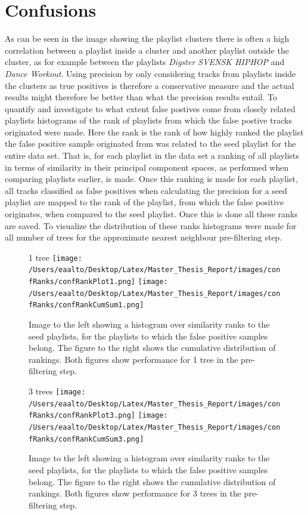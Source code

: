 \documentclass[a4paper,11pt]{kth-mag}
\begin{document}
\section{Confusions}
As can be seen in the image showing the playlist clusters there is often a high correlation between a playlist inside a cluster and another playlist outside the cluster, as for example between the playlists \textit{Digster SVENSK HIPHOP} and \textit{Dance Workout}. Using precision by only considering tracks from playlists inside the clusters as true positives is therefore a conservative measure and the actual results might therefore be better than what the precision results entail. To quantify and investigate to what extent false postives come from closely related playlists histograms of the rank of playlists from which the false postive tracks originated were made. Here the rank is the rank of how highly ranked the playlist the false positive sample originated from was related to the seed playlist for the entire data set. That is, for each playlist in the data set a ranking of all playlists in terms of similarity in their principal component spaces, as performed when comparing playlists earlier, is made. Once this ranking is made for each playlist, all tracks classified as false positives when calculating the precision for a seed playlist are mapped to the rank of the playlist, from which the false positive originates, when compared to the seed playlist. Once this is done all these ranks are saved. To visualize the distribution of these ranks histograms were made for all number of trees for the approximate nearest neighbour pre-filtering step.

\begin{figure}
1 tree
\texttt{[image: /Users/eaalto/Desktop/Latex/Master\_Thesis\_Report/images/confRanks/confRankPlot1.png]}
\texttt{[image: /Users/eaalto/Desktop/Latex/Master\_Thesis\_Report/images/confRanks/confRankCumSum1.png]}
\caption{Image to the left showing a histogram over similarity ranks to the seed playlists, for the playlists to which the false positive samples belong. The figure to the right shows the cumulative distribution of rankings. Both figures show performance for 1 tree in the pre-filtering step.}
\end{figure}

\begin{figure}
3 trees
\texttt{[image: /Users/eaalto/Desktop/Latex/Master\_Thesis\_Report/images/confRanks/confRankPlot3.png]}
\texttt{[image: /Users/eaalto/Desktop/Latex/Master\_Thesis\_Report/images/confRanks/confRankCumSum3.png]}
\caption{Image to the left showing a histogram over similarity ranks to the seed playlists, for the playlists to which the false positive samples belong. The figure to the right shows the cumulative distribution of rankings. Both figures show performance for 3 trees in the pre-filtering step.}
\end{figure}
\end{document}
